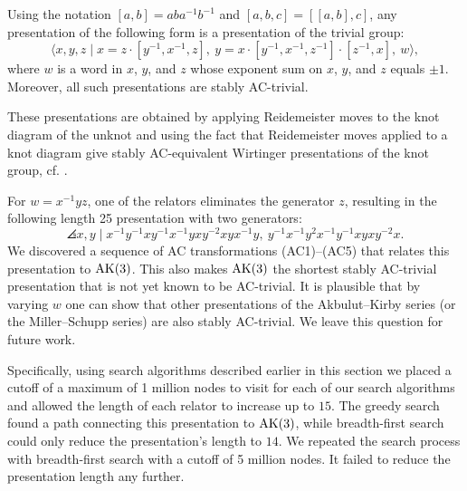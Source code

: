 \begin{theorem*}\label{theorem:MMS}
	Using the notation $[a, b] = a b a^{-1} b^{-1}$ and $[a, b, c] = [[a, b], c]$, any presentation of the following form is a presentation of the trivial group:
	\[
	\langle x, y, z \mid x = z \cdot [y^{-1}, x^{-1}, z],\ y = x \cdot [y^{-1}, x^{-1}, z^{-1}] \cdot [z^{-1}, x],\ w \rangle,
	\]
	where $w$ is a word in $x$, $y$, and $z$ whose exponent sum on $x$, $y$, and $z$ equals $\pm 1$. Moreover, all such presentations are stably AC-trivial.
\end{theorem*}

These presentations are obtained by applying Reidemeister moves to the knot diagram of the unknot and using the fact that Reidemeister moves applied to a knot diagram give stably AC-equivalent Wirtinger presentations of the knot group, cf. \cite{WADA1994241}.

For $w = x^{-1}yz$, one of the relators eliminates the generator $z$, resulting in the following length 25 presentation with two generators:
\[
\angles{ x, y \mid
	x^{-1}y^{-1}xy^{-1}x^{-1}yxy^{-2}xyx^{-1}y, \
	y^{-1}x^{-1}y^2x^{-1}y^{-1}xyxy^{-2}x }.
\]
We discovered a sequence of AC transformations (AC1)--(AC5) that relates this presentation to $\text{AK}(3)$.
This also makes $\text{AK}(3)$ the shortest stably AC-trivial presentation that is not yet known to be AC-trivial.
It is plausible that by varying $w$ one can show that other presentations of the Akbulut--Kirby series (or the Miller--Schupp series) are also stably AC-trivial.
We leave this question for future work.

Specifically, using search algorithms described earlier in this section we placed a cutoff of a maximum of 1 million nodes to visit for each of our search algorithms and allowed the length of each relator to increase up to $15$.
The greedy search found a path connecting this presentation to $\text{AK}(3)$, while breadth-first search could only reduce the presentation's length to $14$.
We repeated the search process with breadth-first search with a cutoff of 5 million nodes.
It failed to reduce the presentation length any further.

